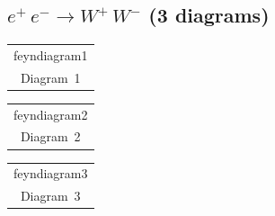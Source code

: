 \documentclass[a4paper,11pt]{article}
\makeatletter
\newcommand{\FeynDiagram}[1]{\csname feyndiagram#1\endcsname}
\newcommand{\FeynCell}[1]{\begin{tabular}[t]{@{}c@{}}\FeynDiagram{#1}\\[1ex]\small Diagram~#1\end{tabular}}
\makeatother
\begin{document}
\setlength{\parindent}{0pt}
\subsection*{$e^{+}\,e^{-} \to W^{+}\,W^{-}$ \normalfont(3 diagrams)}
\noindent \FeynCell{1}\hfill \FeynCell{2}\hfill \FeynCell{3}\par\bigskip
\end{document}
